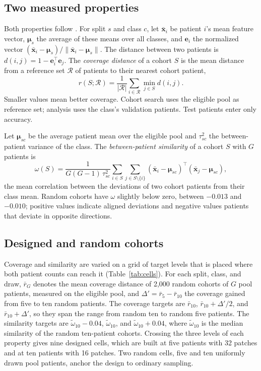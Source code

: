 \documentclass[11pt]{article}
\begin{document}
\subsection{Two measured properties}
\label{sec:quantities}
Both properties follow \citet{queisler2026coverageRedundancy}. For split $s$ and class $c$, let $\bar{\mathbf x}_{i}$ be patient $i$'s mean feature vector, $\boldsymbol\mu_s$ the average of these means over all classes, and $\mathbf e_i$ the normalized vector $(\bar{\mathbf x}_i-\boldsymbol\mu_s)/\lVert\bar{\mathbf x}_i-\boldsymbol\mu_s\rVert$. The distance between two patients is $d(i,j)=1-\mathbf e_i^{\top}\mathbf e_j$. The \emph{coverage distance} of a cohort $S$ is the mean distance from a reference set $\mathcal R$ of patients to their nearest cohort patient,
\begin{equation}
 r(S;\mathcal R)=\frac{1}{|\mathcal R|}\sum_{i\in\mathcal R}\min_{j\in S}d(i,j).
 \label{eq:coverage}
\end{equation}
\noindent Smaller values mean better coverage. Cohort search uses the eligible pool as reference set; analysis uses the class's validation patients. Test patients enter only accuracy.

Let $\boldsymbol\mu_{sc}$ be the average patient mean over the eligible pool and $\tau^2_{sc}$ the between-patient variance of the class. The \emph{between-patient similarity} of a cohort $S$ with $G$ patients is
\begin{equation}
 \omega(S)=\frac{1}{G(G-1)\,\tau^2_{sc}}\sum_{i\in S}\sum_{j\in S\setminus\{i\}}(\bar{\mathbf x}_i-\boldsymbol\mu_{sc})^{\top}(\bar{\mathbf x}_j-\boldsymbol\mu_{sc}),
 \label{eq:omega}
\end{equation}
\noindent the mean correlation between the deviations of two cohort patients from their class mean. Random cohorts have $\omega$ slightly below zero, between $-0.013$ and $-0.010$; positive values indicate aligned deviations and negative values patients that deviate in opposite directions.

\subsection{Designed and random cohorts}
\label{sec:cohorts}
Coverage and similarity are varied on a grid of target levels that is placed where both patient counts can reach it (Table~\ref{tab:cells}). For each split, class, and draw, $\bar r_G$ denotes the mean coverage distance of 2,000 random cohorts of $G$ pool patients, measured on the eligible pool, and $\Delta'=\bar r_5-\bar r_{10}$ the coverage gained from five to ten random patients. The coverage targets are $\bar r_{10}$, $\bar r_{10}+\Delta'/2$, and $\bar r_{10}+\Delta'$, so they span the range from random ten to random five patients. The similarity targets are $\tilde\omega_{10}-0.04$, $\tilde\omega_{10}$, and $\tilde\omega_{10}+0.04$, where $\tilde\omega_{10}$ is the median similarity of the random ten-patient cohorts. Crossing the three levels of each property gives nine designed cells, which are built at five patients with 32 patches and at ten patients with 16 patches. Two random cells, five and ten uniformly drawn pool patients, anchor the design to ordinary sampling.
\end{document}
